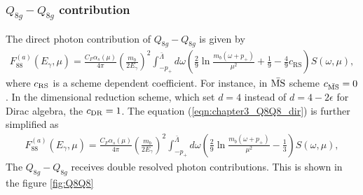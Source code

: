 \subsubsection{$Q_{8g}-Q_{8g}$ contribution} 
\vspace{-0.3cm}
The direct photon contribution of $Q_{8g}-Q_{8g}$ is given by \cite{Benzke:2010js}
\begin{eqnarray}\label{eqn:chapter3_Q8Q8_dir}
F_{88}^{(a)}\left(E_{\gamma}, \mu\right)=\frac{C_{F} \alpha_{s}(\mu)}{4 \pi}\left(\frac{m_{b}}{2 E_{\gamma}}\right)^{2} \int_{-p_{+}}^{\bar{\Lambda}} d \omega\left(\frac{2}{9} \ln \frac{m_{b}\left(\omega+p_{+}\right)}{\mu^{2}}+\frac{1}{9}-\frac{4}{9} c_{\mathrm{RS}}\right) S(\omega, \mu),
\end{eqnarray}
where $c_{\rm{RS}}$ is a scheme dependent coefficient. For instance, in $\bar{\rm{MS}}$ scheme $c_{\bar{\rm{MS}}}=0$. In the dimensional reduction scheme, which set $d=4$ instead of $d=4-2\epsilon$ for Dirac algebra, the $c_{\rm{DR}}=1$. The equation (\ref{eqn:chapter3_Q8Q8_dir}) is further simplified as 
\begin{eqnarray}
F_{88}^{(a)}\left(E_{\gamma}, \mu\right)=\frac{C_{F} \alpha_{s}(\mu)}{4 \pi}\left(\frac{m_{b}}{2 E_{\gamma}}\right)^{2} \int_{-p_{+}}^{\bar{\Lambda}} d \omega\left(\frac{2}{9} \ln \frac{m_{b}\left(\omega+p_{+}\right)}{\mu^{2}}-\frac{1}{3}\right) S(\omega, \mu),
\end{eqnarray}
The $Q_{8g}-Q_{8g}$ receives double resolved photon contributions. This is shown in the figure \ref{fig:Q8Q8}

